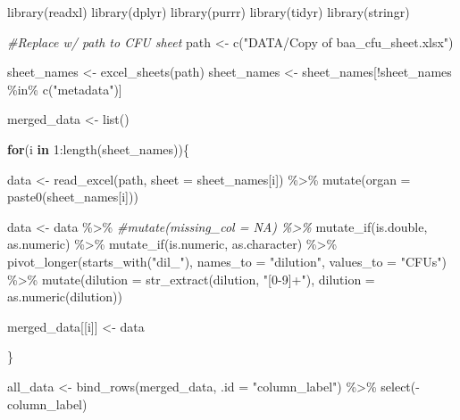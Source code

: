 \documentclass[
]{book}
\newenvironment{Shaded}{\begin{snugshade}}{\end{snugshade}}
\newcommand{\AttributeTok}[1]{\textcolor[rgb]{0.77,0.63,0.00}{#1}}
\newcommand{\CommentTok}[1]{\textcolor[rgb]{0.56,0.35,0.01}{\textit{#1}}}
\newcommand{\ControlFlowTok}[1]{\textcolor[rgb]{0.13,0.29,0.53}{\textbf{#1}}}
\newcommand{\DecValTok}[1]{\textcolor[rgb]{0.00,0.00,0.81}{#1}}
\newcommand{\FunctionTok}[1]{\textcolor[rgb]{0.00,0.00,0.00}{#1}}
\newcommand{\NormalTok}[1]{#1}
\newcommand{\OtherTok}[1]{\textcolor[rgb]{0.56,0.35,0.01}{#1}}
\newcommand{\SpecialCharTok}[1]{\textcolor[rgb]{0.00,0.00,0.00}{#1}}
\newcommand{\StringTok}[1]{\textcolor[rgb]{0.31,0.60,0.02}{#1}}
\begin{document}
\begin{Shaded}
\begin{Highlighting}[]
\FunctionTok{library}\NormalTok{(readxl)}
\FunctionTok{library}\NormalTok{(dplyr)}
\FunctionTok{library}\NormalTok{(purrr)}
\FunctionTok{library}\NormalTok{(tidyr)}
\FunctionTok{library}\NormalTok{(stringr)}

\CommentTok{\#Replace w/ path to CFU sheet}
\NormalTok{path }\OtherTok{\textless{}{-}} \FunctionTok{c}\NormalTok{(}\StringTok{"DATA/Copy of baa\_cfu\_sheet.xlsx"}\NormalTok{)}

\NormalTok{sheet\_names }\OtherTok{\textless{}{-}} \FunctionTok{excel\_sheets}\NormalTok{(path)}
\NormalTok{sheet\_names }\OtherTok{\textless{}{-}}\NormalTok{ sheet\_names[}\SpecialCharTok{!}\NormalTok{sheet\_names }\SpecialCharTok{\%in\%} \FunctionTok{c}\NormalTok{(}\StringTok{"metadata"}\NormalTok{)]}

\NormalTok{merged\_data }\OtherTok{\textless{}{-}} \FunctionTok{list}\NormalTok{()}

\ControlFlowTok{for}\NormalTok{(i }\ControlFlowTok{in} \DecValTok{1}\SpecialCharTok{:}\FunctionTok{length}\NormalTok{(sheet\_names))\{}
  
\NormalTok{  data }\OtherTok{\textless{}{-}} \FunctionTok{read\_excel}\NormalTok{(path, }\AttributeTok{sheet =}\NormalTok{ sheet\_names[i]) }\SpecialCharTok{\%\textgreater{}\%} 
    \FunctionTok{mutate}\NormalTok{(}\AttributeTok{organ =} \FunctionTok{paste0}\NormalTok{(sheet\_names[i]))}
  
\NormalTok{  data }\OtherTok{\textless{}{-}}\NormalTok{ data }\SpecialCharTok{\%\textgreater{}\%} 
    \CommentTok{\#mutate(missing\_col = NA) \%\textgreater{}\% }
    \FunctionTok{mutate\_if}\NormalTok{(is.double, as.numeric) }\SpecialCharTok{\%\textgreater{}\%} 
    \FunctionTok{mutate\_if}\NormalTok{(is.numeric, as.character) }\SpecialCharTok{\%\textgreater{}\%} 
    \FunctionTok{pivot\_longer}\NormalTok{(}\FunctionTok{starts\_with}\NormalTok{(}\StringTok{"dil\_"}\NormalTok{), }\AttributeTok{names\_to =} \StringTok{"dilution"}\NormalTok{,}
                 \AttributeTok{values\_to =} \StringTok{"CFUs"}\NormalTok{) }\SpecialCharTok{\%\textgreater{}\%} 
    \FunctionTok{mutate}\NormalTok{(}\AttributeTok{dilution =} \FunctionTok{str\_extract}\NormalTok{(dilution, }\StringTok{"[0{-}9]+"}\NormalTok{),}
           \AttributeTok{dilution =} \FunctionTok{as.numeric}\NormalTok{(dilution))}
    
  
\NormalTok{  merged\_data[[i]] }\OtherTok{\textless{}{-}}\NormalTok{ data}
  
  
\NormalTok{\}}
  
\NormalTok{all\_data }\OtherTok{\textless{}{-}} \FunctionTok{bind\_rows}\NormalTok{(merged\_data, }\AttributeTok{.id =} \StringTok{"column\_label"}\NormalTok{) }\SpecialCharTok{\%\textgreater{}\%} 
    \FunctionTok{select}\NormalTok{(}\SpecialCharTok{{-}}\NormalTok{column\_label)}
\end{Highlighting}
\end{Shaded}
\end{document}
